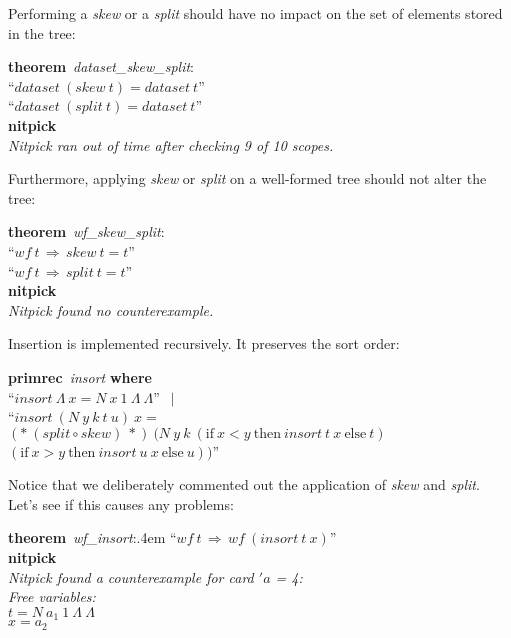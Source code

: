 \documentclass[a4paper,12pt]{article}
\begin{document}
Performing a \textit{skew} or a \textit{split} should have no impact on the set
of elements stored in the tree:

\prew
\textbf{theorem}~\textit{dataset\_skew\_split\/}:\\
``$\textit{dataset}~(\textit{skew}~t) = \textit{dataset}~t$'' \\
``$\textit{dataset}~(\textit{split}~t) = \textit{dataset}~t$'' \\
\textbf{nitpick} \\[2\smallskipamount]
{\slshape Nitpick ran out of time after checking 9 of 10 scopes.}
\postw

Furthermore, applying \textit{skew} or \textit{split} on a well-formed tree
should not alter the tree:

\prew
\textbf{theorem}~\textit{wf\_skew\_split\/}:\\
``$\textit{wf}~t\,\Longrightarrow\, \textit{skew}~t = t$'' \\
``$\textit{wf}~t\,\Longrightarrow\, \textit{split}~t = t$'' \\
\textbf{nitpick} \\[2\smallskipamount]
{\slshape Nitpick found no counterexample.}
\postw

Insertion is implemented recursively. It preserves the sort order:

\prew
\textbf{primrec}~\textit{insort} \textbf{where} \\
``$\textit{insort}~\Lambda~x = N~x~1~\Lambda~\Lambda$'' $\,\mid$ \\
``$\textit{insort}~(N~y~k~t~u)~x =$ \\
\phantom{``}$({*}~(\textit{split} \circ \textit{skew})~{*})~(N~y~k~(\textrm{if}~x < y~\textrm{then}~\textit{insort}~t~x~\textrm{else}~t)$ \\
$(\textrm{if}~x > y~\textrm{then}~\textit{insort}~u~x~\textrm{else}~u))$''
\postw

Notice that we deliberately commented out the application of \textit{skew} and
\textit{split}. Let's see if this causes any problems:

\prew
\textbf{theorem}~\textit{wf\_insort\/}:\kern.4em ``$\textit{wf}~t\,\Longrightarrow\, \textit{wf}~(\textit{insort}~t~x)$'' \\
\textbf{nitpick} \\[2\smallskipamount]
\slshape Nitpick found a counterexample for \textit{card} $'a$ = 4: \\[2\smallskipamount]
\hbox{}\qquad Free variables: \nopagebreak \\
\hbox{}\qquad\qquad $t = N~a_1~1~\Lambda~\Lambda$ \\
\hbox{}\qquad\qquad $x = a_2$
\postw
\end{document}
